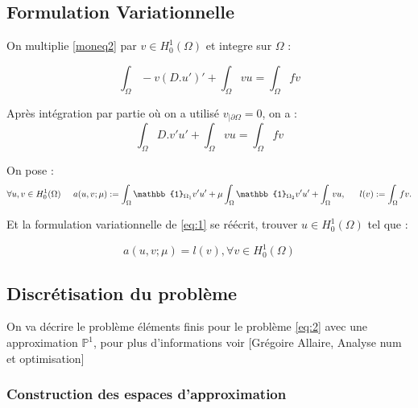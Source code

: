 \documentclass[12pt]{article}
\begin{document}
\subsection{Formulation Variationnelle}

On multiplie \eqref{moneq2} par $v \in H_{0}^{1}(\Omega)$ et integre sur $\Omega$ :

\begin{equation} \label{eq:1}
\int_{\Omega} -v(D.u')' + \int_{\Omega} vu = \int_{\Omega} fv 
\end{equation}

Après intégration par partie où on a utilisé $ v_{|\partial \Omega} = 0 $, on a :
$$
 \int_{\Omega} D.v'u' + \int_{\Omega} vu = \int_{\Omega} fv 
$$

On pose :
$$
\forall u, v \in H_{0}^{1}(\Omega) 
\hspace{0.5 cm}
a(u,v;\mu) := \int_{\Omega} \mathbb{1}_{\Omega_{1}}v'u' + \mu\int_{\Omega} \mathbb{1}_{\Omega_{2}} v'u' + \int_{\Omega} vu 
\text{, }
\hspace{0.5 cm}
l(v) := \int_{\Omega} fv.
$$

Et la formulation variationnelle de \eqref{eq:1} se réécrit, trouver 
$u \in H_{0}^{1}(\Omega)$ tel que :


\begin{equation} \label{eq:2}
a(u,v;\mu) = l(v) , \forall v \in H_{0}^{1}(\Omega)
\end{equation}














\subsection{Discrétisation du problème }

On va décrire le problème éléments finis pour le problème 
 \eqref{eq:2} avec une approximation $\mathbb{P}^{1}$, pour plus d'informations voir [Grégoire Allaire, Analyse num et optimisation]


\subsubsection{Construction des espaces d’approximation } 
\end{document}
